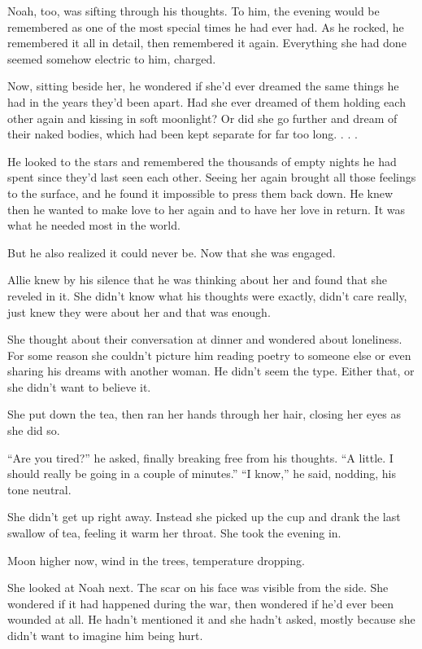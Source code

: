 \documentclass[10pt, twoside, openright]{book}
\begin{document}
Noah, too, was sifting through his thoughts. To him, the evening would
be remembered as one of the most special times he had ever had. As he
rocked, he remembered it all in detail, then remembered it again.
Everything she had done seemed somehow electric to him, charged.

Now, sitting beside her, he wondered if she'd ever dreamed the same
things he had in the years they'd been apart. Had she ever dreamed of
them holding each other again and kissing in soft moonlight? Or did she
go further and dream of their naked bodies, which had been kept separate
for far too long. . . .

He looked to the stars and remembered the thousands of empty nights he
had spent since they'd last seen each other. Seeing her again brought
all those feelings to the surface, and he found it impossible to press
them back down. He knew then he wanted to make love to her again and to
have her love in return. It was what he needed most in the world.


But he also realized it could never be. Now that she was engaged.


Allie knew by his silence that he was thinking about her and found that
she reveled in it. She didn't know what his thoughts were exactly,
didn't care really, just knew they were about her and that was enough.

She thought about their conversation at dinner and wondered about
loneliness. For some reason she couldn't picture him reading poetry to
someone else or even sharing his dreams with another woman. He didn't
seem the type. Either that, or she didn't want to believe it.

She put down the tea, then ran her hands through her hair, closing her
eyes as she did so.


``Are you tired?'' he asked, finally breaking free from his thoughts.
``A little. I should really be going in a couple of minutes.'' ``I
know,'' he said, nodding, his tone neutral.


She didn't get up right away. Instead she picked up the cup and drank
the last swallow of tea, feeling it warm her throat. She took the
evening in.

Moon higher now, wind in the trees, temperature dropping.

She looked at Noah next. The scar on his face was visible from the side.
She wondered if it had happened during the war, then wondered if he'd
ever been wounded at all. He hadn't mentioned it and she hadn't asked,
mostly because she didn't want to imagine him being hurt.
\end{document}
